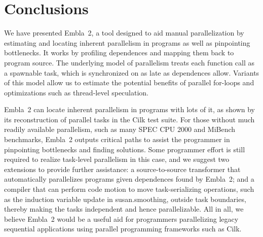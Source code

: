 \section{Conclusions}

We have presented Embla~2, a tool designed to aid manual parallelization by estimating and locating inherent parallelism in programs as well as pinpointing bottlenecks.
It works by profiling dependences and mapping them back to program source.
The underlying model of parallelism treats each function call as a spawnable task, which is synchronized on as late as dependences allow.
Variants of this model allow us to estimate the potential benefits of parallel for-loops and optimizations such as thread-level speculation.

Embla~2 can locate inherent parallelism in programs with lots of it,
as shown by its reconstruction of parallel tasks in the Cilk test suite.
For those without much readily available parallelism,
such as many SPEC CPU 2000 and MiBench benchmarks,
Embla~2 outputs critical paths to assist the programmer in pinpointing bottlenecks and finding solutions.
Some programmer effort is still required to realize task-level parallelism in this case,
and we suggest two extensions to provide further assistance:
a source-to-source transformer that automatically parallelizes programs given dependences found by Embla~2;
and a compiler that can perform code motion to move task-serializing operations,
such as the induction variable update in \textsf{susan.smoothing}, outside task boundaries,
thereby making the tasks independent and hence parallelizable.
All in all, we believe Embla~2 would be a useful aid for programmers parallelizing legacy sequential applications using parallel programming frameworks such as Cilk.
